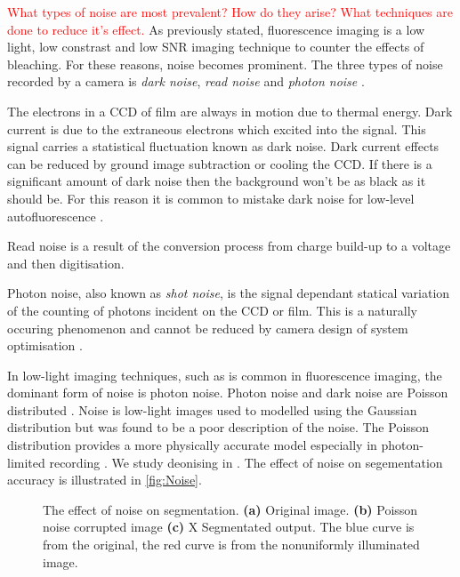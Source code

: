 \begin{definition}[Noise]
\textcolor{red}{What types of noise are most prevalent? How do they arise? What techniques are done to reduce it's effect.}
As previously stated, fluorescence imaging is a low light, low constrast and low SNR imaging technique to counter the effects of bleaching.
For these reasons, noise becomes prominent. The three types of noise recorded by a camera is \textit{dark noise}, \textit{read noise} and \textit{photon noise} \citep{Dobrucki2013,Danek2012,Matula2012,Hubeny2008}.

The electrons in a CCD of film are always in motion due to thermal energy.
Dark current is due to the extraneous electrons which excited into the signal.
This signal carries a statistical fluctuation known as dark noise.
Dark current effects can be reduced by ground image subtraction or cooling the CCD.
If there is a significant amount of dark noise then the background won't be as black as it should be.
For this reason it is common to mistake dark noise for low-level autofluorescence \citep{Ryan2016,Dobrucki2013}.

Read noise is a result of the conversion process from charge build-up to a voltage and then digitisation.

Photon noise, also known as \textit{shot noise}, is the signal dependant statical variation of the counting of photons incident on the CCD or film.
This is a naturally occuring phenomenon and cannot be reduced by camera design of system optimisation \cite{Ryan2016}.

In low-light imaging techniques, such as is common in fluorescence imaging, the dominant form of noise is photon noise.
Photon noise and dark noise are Poisson distributed \citep{Danek2012,Ryan2016,Kempen1999}.
Noise is low-light images used to modelled using the Gaussian distribution but was found to be a poor description of the noise.
The Poisson distribution provides a more physically accurate model especially in photon-limited recording \citep{Sarder2006}.
We study deonising in .
The effect of noise on segementation accuracy is illustrated in \autoref{fig:Noise}.

\begin{figure}[!t]
	\centering
	\caption{The effect of noise on segmentation. \textbf{(a)} Original image. \textbf{(b)} Poisson noise corrupted image \textbf{(c)} X Segmentated output. The blue curve is from the original, the red curve is from the nonuniformly illuminated image.}
	\label{fig:Noise}
\end{figure}
\end{definition}

